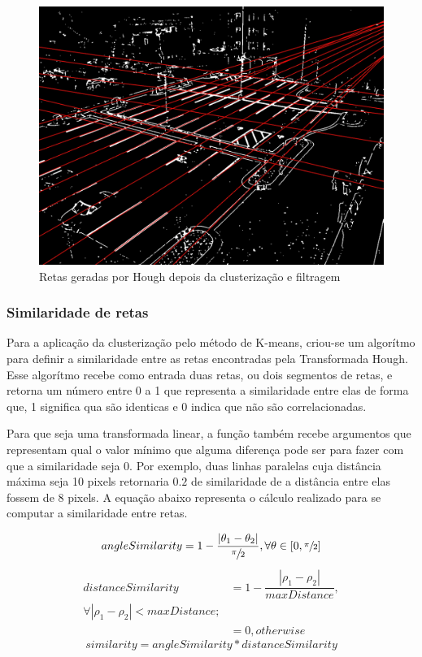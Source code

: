 \documentclass[10pt,twocolumn,letterpaper]{article}
\begin{document}
\begin{figure}[!htb]
\centering
\includegraphics[width=\columnwidth]{hough-linhas-cluster.jpg}
 \caption{Retas geradas por Hough depois da clusterização e filtragem}
\label{fig:retacluster}
\end{figure}

\subsubsection{Similaridade de retas}

	Para a aplicação da clusterização pelo método de K-means, criou-se um algorítmo
para definir a similaridade entre as retas encontradas pela Transformada Hough. Esse
algorítmo recebe como entrada duas retas, ou dois segmentos de retas, e retorna um
número entre 0 a 1 que representa a similaridade entre elas de forma que, 1 significa
qua são identicas e 0 indica que não são correlacionadas.

	Para que seja uma transformada linear, a função também recebe argumentos que
representam qual o valor mínimo que alguma diferença pode ser para fazer com que a
similaridade seja 0. Por exemplo, duas linhas paralelas cuja distância máxima seja 10 pixels
retornaria $0.2$ de similaridade de a distância entre elas fossem de 8 pixels. A equação abaixo
representa o cálculo realizado para se computar a similaridade entre retas.

\begin{equation*}
angleSimilarity = 1 - \dfrac{|\theta_1 - \theta_2|}{\sfrac{\pi}{2}} , \forall \theta \in [0,\sfrac{\pi}{2}]
\end{equation*}
\begin{equation*}
\begin{split}
distanceSimilarity &= 1 - \dfrac{|\rho_1 - \rho_2|}{maxDistance}, \\
\forall |\rho_1 - \rho_2| < maxDistance; \\
&= 0, otherwise
\end{split}
\end{equation*}
\begin{equation}
similarity = angleSimilarity*distanceSimilarity
\end{equation}
\end{document}
